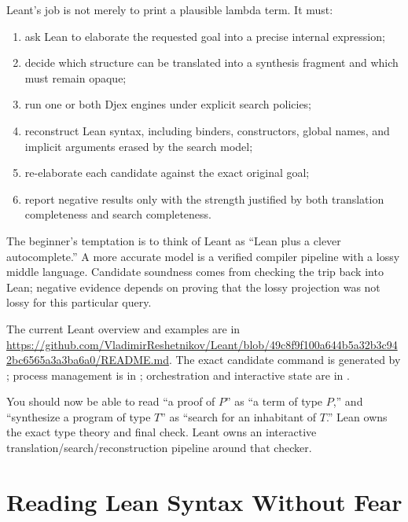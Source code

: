 \documentclass[10pt,letterpaper,oneside,openany]{report}
\begin{document}
Leant's job is not merely to print a plausible lambda term.  It must:

\begin{enumerate}
\item ask Lean to elaborate the requested goal into a precise internal expression;
\item decide which structure can be translated into a synthesis fragment and which must remain opaque;
\item run one or both Djex engines under explicit search policies;
\item reconstruct Lean syntax, including binders, constructors, global names, and implicit arguments erased by the search model;
\item re-elaborate each candidate against the exact original goal;
\item report negative results only with the strength justified by both translation completeness and search completeness.
\end{enumerate}

\begin{leantbox}
The beginner's temptation is to think of Leant as ``Lean plus a clever autocomplete.''  A more accurate model is a verified compiler pipeline with a lossy middle language.  Candidate soundness comes from checking the trip back into Lean; negative evidence depends on proving that the lossy projection was not lossy for this particular query.
\end{leantbox}

\begin{sourcebox}
The current Leant overview and examples are in \url{https://github.com/VladimirReshetnikov/Leant/blob/49c8f9f100a644b5a32b3c942bc6565a3a3ba6a0/README.md}.  The exact candidate command is generated by ; process management is in ; orchestration and interactive state are in .
\end{sourcebox}

\begin{recapbox}
You should now be able to read ``a proof of $P$'' as ``a term of type $P$,'' and ``synthesize a program of type $T$'' as ``search for an inhabitant of $T$.''  Lean owns the exact type theory and final check.  Leant owns an interactive translation/search/reconstruction pipeline around that checker.
\end{recapbox}

\chapter{Reading Lean Syntax Without Fear}\label{ch:syntax}
\end{document}
